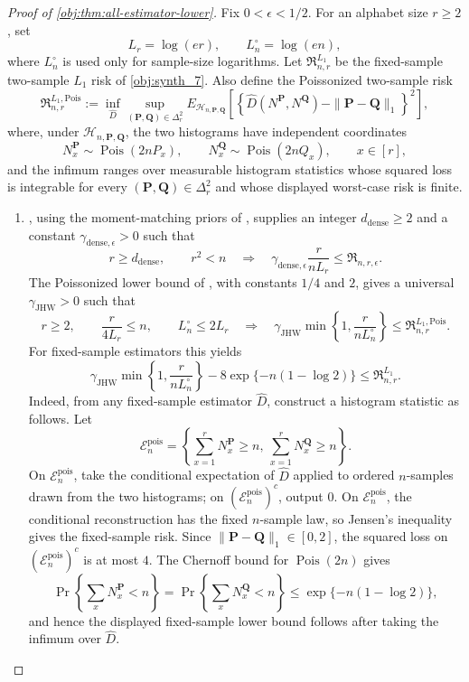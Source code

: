 \documentclass[11pt]{article}
\begin{document}
\begin{proof}[Proof of \cref{obj:thm:all-estimator-lower}]
Fix \(0<\epsilon<1/2\).  For an alphabet size \(r\ge2\), set
\[
L_r=\log(er),
\qquad
L_n^\circ=\log(en),
\]
where \(L_n^\circ\) is used only for sample-size logarithms.  Let
\(\mathfrak R^{L_1}_{n,r}\) be the fixed-sample two-sample \(L_1\) risk of
\cref{obj:synth_7}.  Also define the Poissonized two-sample risk
\[
\mathfrak R^{L_1,\mathrm{Pois}}_{n,r}
:=
\inf_{\widehat D}
\sup_{(\mathbf P,\mathbf Q)\in\Delta_r^2}
E_{\mathcal H_{n,\mathbf P,\mathbf Q}}
\left[
\left\{\widehat D(N^{\mathbf P},N^{\mathbf Q})
-\|\mathbf P-\mathbf Q\|_1\right\}^2
\right],
\]
where, under \(\mathcal H_{n,\mathbf P,\mathbf Q}\), the two histograms have
independent coordinates
\[
N^{\mathbf P}_x\sim\operatorname{Pois}(2nP_x),
\qquad
N^{\mathbf Q}_x\sim\operatorname{Pois}(2nQ_x),
\qquad x\in[r],
\]
and the infimum ranges over measurable histogram statistics whose squared loss
is integrable for every \((\mathbf P,\mathbf Q)\in\Delta_r^2\) and whose
displayed worst-case risk is finite.

\begin{enumerate}
\item
{}, using the moment-matching priors of
\citep[Lemma 1 and Section 3.1]{CaiLow2011L1}, supplies an integer
\(d_{\mathrm{dense}}\ge2\) and a constant
\(\gamma_{\mathrm{dense},\epsilon}>0\) such that
\[
r\ge d_{\mathrm{dense}},\qquad r^2<n
\quad\Longrightarrow\quad
\gamma_{\mathrm{dense},\epsilon}\frac{r}{nL_r}
\le
\mathfrak R_{n,r,\epsilon}.
\]
The Poissonized lower bound of
\citep[Theorem 3, equation (24), and Section 3.1]{JiaoHanWeissman2018L1},
with constants \(1/4\) and \(2\), gives a universal
\(\gamma_{\mathrm{JHW}}>0\) such that
\[
r\ge2,\qquad
\frac{r}{4L_r}\le n,\qquad
L_n^\circ\le2L_r
\quad\Longrightarrow\quad
\gamma_{\mathrm{JHW}}
\min\left\{1,\frac{r}{nL_n^\circ}\right\}
\le
\mathfrak R^{L_1,\mathrm{Pois}}_{n,r}.
\]
For fixed-sample estimators this yields
\[
\gamma_{\mathrm{JHW}}
\min\left\{1,\frac{r}{nL_n^\circ}\right\}
-
8\exp\{-n(1-\log2)\}
\le
\mathfrak R^{L_1}_{n,r}.
\]
Indeed, from any fixed-sample estimator \(\widehat D\), construct a histogram
statistic as follows.  Let
\[
\mathcal E_n^{\mathrm{pois}}
=
\left\{
\sum_{x=1}^r N^{\mathbf P}_x\ge n,\ 
\sum_{x=1}^r N^{\mathbf Q}_x\ge n
\right\}.
\]
On \(\mathcal E_n^{\mathrm{pois}}\), take the conditional expectation of
\(\widehat D\) applied to ordered \(n\)-samples drawn from the two histograms;
on \((\mathcal E_n^{\mathrm{pois}})^c\), output \(0\).  On
\(\mathcal E_n^{\mathrm{pois}}\), the conditional reconstruction has the
fixed \(n\)-sample law, so Jensen's inequality gives the fixed-sample risk.
Since \(\|\mathbf P-\mathbf Q\|_1\in[0,2]\), the squared loss on
\((\mathcal E_n^{\mathrm{pois}})^c\) is at most \(4\).  The Chernoff bound for
\(\operatorname{Pois}(2n)\) gives
\[
\Pr\left\{\sum_x N^{\mathbf P}_x<n\right\}
=
\Pr\left\{\sum_x N^{\mathbf Q}_x<n\right\}
\le
\exp\{-n(1-\log2)\},
\]
and hence the displayed fixed-sample lower bound follows after taking the
infimum over \(\widehat D\).


\end{enumerate}
\end{proof}
\end{document}
